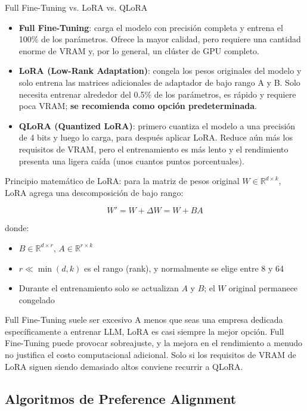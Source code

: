 \documentclass[a4paper]{article}
\begin{document}
\begin{importantbox}{Full Fine-Tuning vs. LoRA vs. QLoRA}
\begin{itemize}
    \item \textbf{Full Fine-Tuning}: carga el modelo con precisión completa y entrena el 100\% de los parámetros. Ofrece la mayor calidad, pero requiere una cantidad enorme de VRAM y, por lo general, un clúster de GPU completo.
    \item \textbf{LoRA (Low-Rank Adaptation)}: congela los pesos originales del modelo y solo entrena las matrices adicionales de adaptador de bajo rango A y B. Solo necesita entrenar alrededor del 0.5\% de los parámetros, es rápido y requiere poca VRAM; \textbf{se recomienda como opción predeterminada}.
    \item \textbf{QLoRA (Quantized LoRA)}: primero cuantiza el modelo a una precisión de 4 bits y luego lo carga, para después aplicar LoRA. Reduce aún más los requisitos de VRAM, pero el entrenamiento es más lento y el rendimiento presenta una ligera caída (unos cuantos puntos porcentuales).
\end{itemize}
\end{importantbox}

Principio matemático de LoRA: para la matriz de pesos original $W \in \mathbb{R}^{d \times k}$, LoRA agrega una descomposición de bajo rango:

$$W' = W + \Delta W = W + BA$$

donde:
\begin{itemize}
    \item $B \in \mathbb{R}^{d \times r}$, $A \in \mathbb{R}^{r \times k}$
    \item $r \ll \min(d, k)$ es el rango (rank), y normalmente se elige entre 8 y 64
    \item Durante el entrenamiento solo se actualizan $A$ y $B$; el $W$ original permanece congelado
\end{itemize}

\begin{warningbox}{Full Fine-Tuning suele ser excesivo}
A menos que seas una empresa dedicada específicamente a entrenar LLM, LoRA es casi siempre la mejor opción. Full Fine-Tuning puede provocar sobreajuste, y la mejora en el rendimiento a menudo no justifica el costo computacional adicional. Solo si los requisitos de VRAM de LoRA siguen siendo demasiado altos conviene recurrir a QLoRA.
\end{warningbox}

\subsection{Algoritmos de Preference Alignment}
\end{document}
